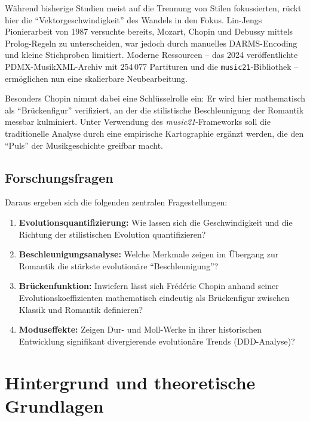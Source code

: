 \documentclass[10pt,a4paper]{article}
\theoremstyle{definition}
\begin{document}
Während bisherige Studien meist auf die Trennung von Stilen fokussierten\autocite[Vgl.][]{LinJeng1987, Simonetta2025}, rückt hier die \enquote{Vektorgeschwindigkeit} des Wandels in den Fokus. Lin-Jengs Pionierarbeit von 1987 versuchte bereits, Mozart, Chopin und Debussy mittels Prolog-Regeln zu unterscheiden, war jedoch durch manuelles DARMS-Encoding und kleine Stichproben limitiert. Moderne Ressourcen -- das 2024 veröffentlichte PDMX-MusikXML-Archiv\autocite{PDMX2024} mit 254\,077 Partituren und die \texttt{music21}-Bibliothek\autocite{Cuthbert2010} -- ermöglichen nun eine skalierbare Neubearbeitung.

Besonders Chopin nimmt dabei eine Schlüsselrolle ein: Er wird hier mathematisch als \enquote{Brückenfigur} verifiziert, an der die stilistische Beschleunigung der Romantik messbar kulminiert. Unter Verwendung des \textit{music21}-Frameworks soll die traditionelle Analyse durch eine empirische Kartographie ergänzt werden, die den \enquote{Puls} der Musikgeschichte greifbar macht.

\subsection{Forschungsfragen}
Daraus ergeben sich die folgenden zentralen Fragestellungen:
\begin{enumerate}
    \item \textbf{Evolutionsquantifizierung:} Wie lassen sich die Geschwindigkeit und die Richtung der stilistischen Evolution quantifizieren?
    
    \item \textbf{Beschleunigungsanalyse:} Welche Merkmale zeigen im Übergang zur Romantik die stärkste evolutionäre \enquote{Beschleunigung}?
    
    \item \textbf{Brückenfunktion:} Inwiefern lässt sich Frédéric Chopin anhand seiner Evolutionskoeffizienten mathematisch eindeutig als Brückenfigur zwischen Klassik und Romantik definieren?
    
    \item \textbf{Moduseffekte:} Zeigen Dur- und Moll-Werke in ihrer historischen Entwicklung signifikant divergierende evolutionäre Trends (DDD-Analyse)?
\end{enumerate}

\section{Hintergrund und theoretische Grundlagen}
\end{document}
